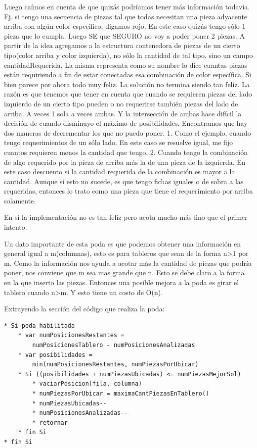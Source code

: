 \documentclass[11pt,a4paper]{article}
\begin{document}
Luego caímos en cuenta de que quizás podríamos tener más información todavía. Ej. si tengo una secuencia de piezas tal que todas necesitan una pieza adyacente arriba con algún color especifico, digamos rojo. En este caso quizás tengo sólo 1 pieza que lo cumpla. Luego SE que SEGURO no voy a poder poner 2 piezas.
A partir de la idea agregamos a la estructura contenedora de piezas de un cierto tipo(color arriba y color izquierda), no sólo la cantidad de tal tipo, sino un campo cantidadRequerida. La misma representa como su nombre lo dice cuantas piezas están requiriendo a fin de estar conectadas esa combinación de color específica.
Si bien parece por ahora todo muy feliz. La solución no termina siendo tan feliz. La razón es que tenemos que tener en cuenta que cuando se requieren piezas del lado izquierdo de un cierto tipo pueden o no requerirse también piezas del lado de arriba. A veces 1 sola a veces ambas. Y la intersección de ambas hace difícil la decisión de cuando disminuyo el máximo de posibilidades. Encontramos que hay dos maneras de decrementar los que no puedo poner. 
1. Como el ejemplo, cuando tengo requerimientos de un sólo lado. En este caso se resuelve igual, me fijo cuantos requieren menos la cantidad que tengo.
2. Cuando tengo la combinación de algo requerido por la pieza de arriba más la de una pieza de la izquierda. En este caso descuento si la cantidad requerida de la combinación es mayor a la cantidad. Aunque si esto no sucede, es que tengo fichas iguales o de sobra a las requeridas, entonces lo trato como una pieza que tiene el requerimiento por arriba solamente. 

En sí la implementación no es tan feliz pero acota mucho más fino que el primer intento. 

Un dato importante de esta poda es que podemos obtener una información en general igual a m(columnas), esto es para tableros que sean de la forma n>1 por m. Como la información nos ayuda a acotar más la cantidad de piezas que podría poner, nos conviene que m sea mas grande que n. Esto se debe claro a la forma en la que inserto las piezas.
Entonces una posible mejora a la poda es girar el tablero cuando n>m. Y esto tiene un costo de O(n).

Extrayendo la sección del código que realiza la poda:

\begin{Verbatim}[commandchars=\\\{\}]
* Si poda_habilitada
	* var numPosicionesRestantes =
		numPosicionesTablero - numPosicionesAnalizadas
	* var posibilidades =
		min(numPosicionesRestantes, numPiezasPorUbicar)
	* Si ((posibilidades + numPiezasUbicadas) <= numPiezasMejorSol)
		* vaciarPosicion(fila, columna)
		* numPiezasPorUbicar = maximaCantPiezasEnTablero()
		* numPiezasUbicadas--
		* numPosicionesAnalizadas--
		* retornar
	* fin Si
* fin Si	
\end{Verbatim}
\end{document}
